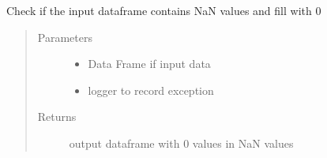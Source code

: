 \documentclass[letterpaper,10pt,english]{sphinxmanual}
\begin{document}
\begin{fulllineitems}
\label{\detokenize{index:dummy_project_utils.check_nan}}
\sphinxAtStartPar
{}

\sphinxAtStartPar
Check if the input dataframe contains NaN values and fill with 0
\begin{quote}\begin{description}
\item[{Parameters}] \leavevmode\begin{itemize}
\item {} 
\sphinxAtStartPar
{} \textendash{} Data Frame if input data

\item {} 
\sphinxAtStartPar
{} \textendash{} logger to record exception

\end{itemize}

\item[{Returns}] \leavevmode
\sphinxAtStartPar
output dataframe with 0 values in NaN values

\end{description}\end{quote}

\end{fulllineitems}

\end{document}
